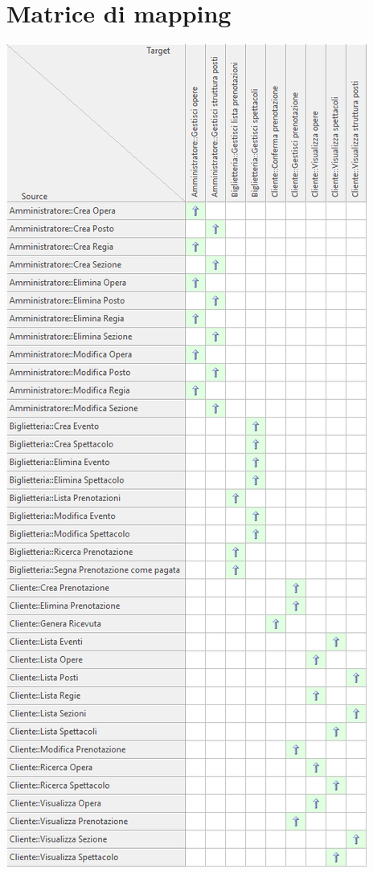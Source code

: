 \documentclass{article}
\begin{document}
    \section{Matrice di mapping}
        \includegraphics{imgs/matrice/matrice}
\end{document}
